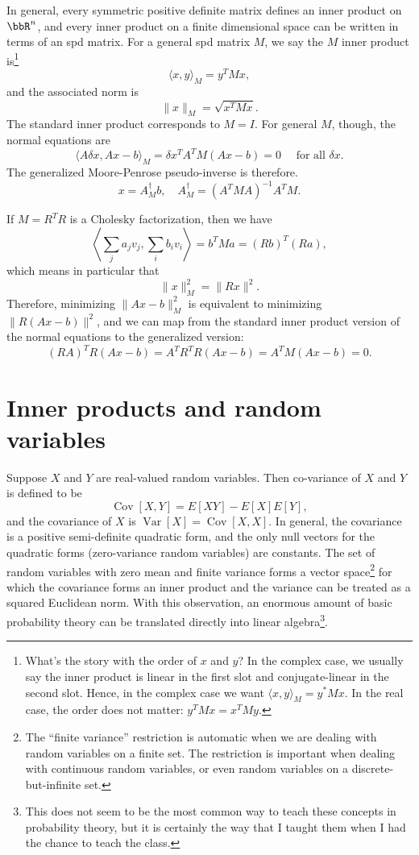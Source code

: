 \documentclass[12pt, leqno]{article} %
\begin{document}
In general, every symmetric positive definite matrix defines an inner
product on $\bbR^{n}$, and every inner product on a finite dimensional
space can be written in terms of an spd matrix.  For a general spd
matrix $M$, we say the $M$ inner product is\footnote{What's the story
  with the order of $x$ and $y$?  In the complex
  case, we usually say the inner product is linear in the first slot
  and conjugate-linear in the second slot.  Hence, in the complex case
  we want $\langle x, y \rangle_M = y^* M x$.  In the real case, the
  order does not matter: $y^T M x = x^T M y$.
}
\[
  \langle x, y \rangle_M = y^T M x,
\]
and the associated norm is
\[
  \|x\|_M = \sqrt{x^T M x}.
\]
The standard inner product corresponds to $M = I$.  For general $M$,
though, the normal equations are
\[
  \langle A \delta x, Ax-b \rangle_M = \delta x^T A^T M (Ax-b) = 0
  \quad \mbox{ for all } \delta x.
\]
The generalized Moore-Penrose pseudo-inverse is therefore.
\[
  x = A_M^\dagger b, \quad A_M^\dagger = (A^T M A)^{-1} A^T M.
\]

If $M = R^T R$ is a Cholesky factorization, then we have
\[
  \left\langle \sum_j a_j v_j, \sum_i b_i v_i \right\rangle =
  b^T M a = (Rb)^T (Ra),
\]
which means in particular that
\[
  \|x\|_M^2 = \|Rx\|^2.
\]
Therefore, minimizing $\|Ax-b\|_M^2$ is equivalent to minimizing
$\|R(Ax-b)\|^2$, and we can map from the standard inner product
version of the normal equations to the generalized version:
\[
  (RA)^T R(Ax-b) = A^T R^T R (Ax-b) = A^T M (Ax-b) = 0.
\]

\section{Inner products and random variables}

Suppose $X$ and $Y$ are real-valued random variables.
Then co-variance of $X$ and $Y$ is defined to be
\[
  \operatorname{Cov}[X, Y] = E[XY] - E[X] E[Y],
\]
and the covariance of $X$ is
$\operatorname{Var}[X] = \operatorname{Cov}[X, X]$.
In general, the covariance is a positive semi-definite
quadratic form, and the only null vectors for the quadratic forms
(zero-variance random variables) are constants.  The set of random
variables with zero mean and finite variance forms a vector
space\footnote{The ``finite variance'' restriction is automatic when we are
  dealing with random variables on a finite set.  The restriction is
  important when dealing with continuous random variables, or even
  random variables on a discrete-but-infinite set.} for which the
covariance forms an inner product and the variance can be treated as a
squared Euclidean norm.  With this observation, an enormous amount of
basic probability theory can be translated directly into linear
algebra\footnote{This does not seem to be the most common way to teach
  these concepts in probability theory, but it is certainly the way
  that I taught them when I had the chance to teach the class.}.
\end{document}
